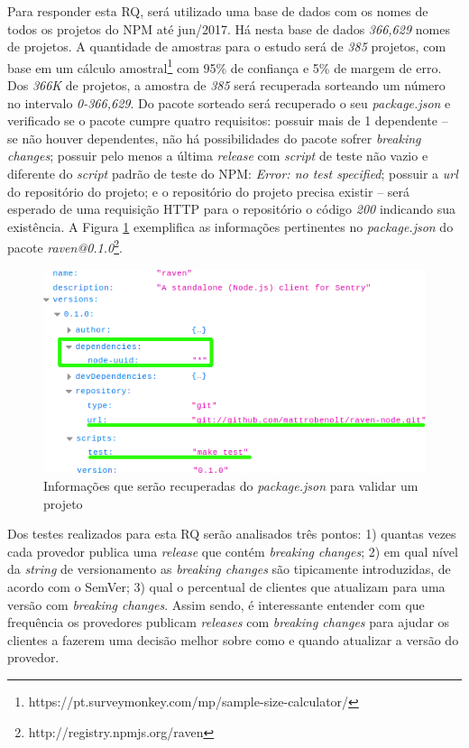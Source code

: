 Para responder esta RQ, será utilizado uma base de dados com os nomes de todos os projetos do \Gls{NPM} até jun/2017. Há nesta base de dados \textit{366,629} nomes de projetos. A quantidade de amostras para o estudo será de \textit{385} projetos, com base em um cálculo amostral\footnote{https://pt.surveymonkey.com/mp/sample-size-calculator/} com 95\% de confiança e 5\% de margem de erro. Dos \textit{366K} de projetos, a amostra de \textit{385} será recuperada sorteando um número no intervalo \textit{0-366,629}. Do pacote sorteado será recuperado o seu \textit{package.json} e verificado se o pacote cumpre quatro requisitos: possuir mais de 1 dependente --  se não houver dependentes, não há possibilidades do pacote sofrer \textit{breaking changes}; possuir pelo menos a última \textit{release} com \textit{script} de teste não vazio e diferente do \textit{script} padrão de teste do \gls{NPM}: \textit{Error: no test specified}; possuir a \textit{url} do repositório do projeto; e o repositório do projeto precisa existir -- será esperado de uma requisição \Gls{HTTP} para o repositório o código \textit{200} indicando sua existência. A Figura \ref{fig:package_json} exemplifica as informações pertinentes no \textit{package.json} do pacote \textit{raven@0.1.0}\footnote{http://registry.npmjs.org/raven}.

\begin{figure}
    \centering
    \includegraphics[scale=0.7]{figuras/package_json.png}
    \caption{Informações que serão recuperadas do \textit{package.json} para validar um projeto}
    \label{fig:package_json}
\end{figure}{}

Dos testes realizados para esta RQ serão analisados três pontos: 1) quantas vezes cada provedor publica uma \textit{release} que contém \textit{breaking changes}; 2) em qual nível da \textit{string} de versionamento as \textit{breaking changes} são tipicamente introduzidas, de acordo com o \Gls{SemVer}; 3) qual o percentual de clientes que atualizam para uma versão com \textit{breaking changes}. Assim sendo, é interessante entender com que frequência os provedores publicam \textit{releases} com \textit{breaking changes} para ajudar os clientes a fazerem uma decisão melhor sobre como e quando atualizar a versão do provedor.

